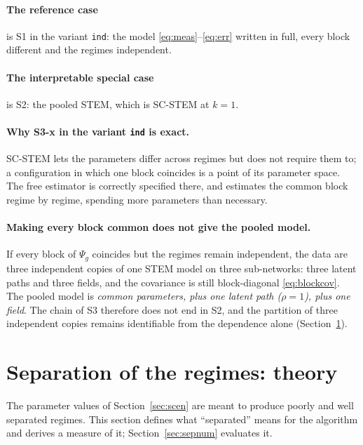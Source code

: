 \documentclass[11pt]{article}
\begin{document}
\paragraph{The reference case} is S1 in the variant \texttt{ind}: the model \eqref{eq:meas}--\eqref{eq:err} written in full, every block different and the regimes independent.

\paragraph{The interpretable special case} is S2: the pooled STEM, which is SC-STEM at $k = 1$.

\paragraph{Why S3-x in the variant \texttt{ind} is exact.} SC-STEM lets the parameters differ across regimes but does not require them to; a configuration in which one block coincides is a point of its parameter space. The free estimator is correctly specified there, and estimates the common block regime by regime, spending more parameters than necessary.

\paragraph{Making every block common does not give the pooled model.} If every block of $\Psi_g$ coincides but the regimes remain independent, the data are three independent copies of one STEM model on three sub-networks: three latent paths and three fields, and the covariance is still block-diagonal \eqref{eq:blockcov}. The pooled model is \emph{common parameters, plus one latent path ($\rho = 1$), plus one field}. The chain of S3 therefore does not end in S2, and the partition of three independent copies remains identifiable from the dependence alone (Section~\ref{sec:sep}).

\section{Separation of the regimes: theory}\label{sec:sep}

The parameter values of Section~\ref{sec:scen} are meant to produce poorly and well separated regimes. This section defines what ``separated'' means for the algorithm and derives a measure of it; Section~\ref{sec:sepnum} evaluates it.
\end{document}

